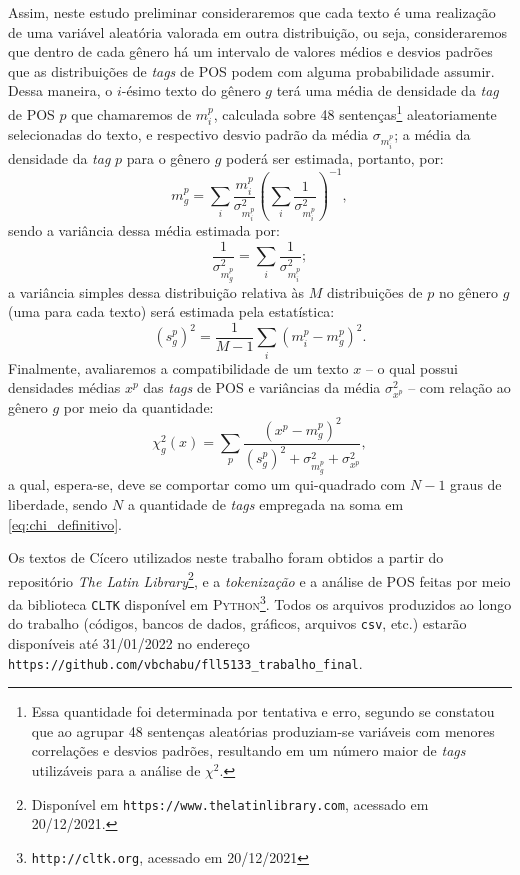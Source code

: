 \documentclass[10pt,a4paper,onecolumn]{article}
\theoremstyle{definition}
\theoremstyle{remark}
\begin{document}
Assim, neste estudo preliminar consideraremos que cada texto é uma realização de uma variável aleatória valorada em outra distribuição, ou seja, consideraremos que dentro de cada gênero há um intervalo de valores médios e desvios padrões que as distribuições de \emph{tags} de POS podem com alguma probabilidade assumir. Dessa maneira, o $i$-ésimo texto do gênero $g$ terá uma média de densidade da \emph{tag} de POS $p$ que chamaremos de $m_i^p$, calculada sobre 48 sentenças\footnote{Essa quantidade foi determinada por tentativa e erro, segundo se constatou que ao agrupar 48 sentenças aleatórias produziam-se variáveis com menores correlações e desvios padrões, resultando em um número maior de \emph{tags} utilizáveis para a análise de $\chi^2$.} aleatoriamente selecionadas do texto, e respectivo desvio padrão da média $\sigma_{m^p_i}$; a média da densidade da \emph{tag} $p$ para o gênero $g$ poderá ser estimada, portanto, por:   
$$m_g^p = \sum_i \frac{m_i^p}{\sigma^2_{m_i^p}} \left( \sum_{i} \frac{1}{\sigma^2_{m_i^p}} \right)^{-1},$$
sendo a variância dessa média estimada por:
$$\frac{1}{\sigma_{m_g^p}^2} = \sum_{i} \frac{1}{\sigma^2_{m_i^p}};$$
a variância simples dessa distribuição relativa às $M$ distribuições de $p$ no gênero $g$ (uma para cada texto) será estimada pela estatística:
$$\left(s^p_g\right)^2 = \frac{1}{M-1} \sum_i \left(m^p_i-m^p_g\right)^2.$$
Finalmente, avaliaremos a compatibilidade de um texto $x$ -- o qual possui densidades médias $x^p$ das \emph{tags} de POS e variâncias da média $\sigma_{x^p}^2$ -- com relação ao gênero $g$ por meio da quantidade: 
\begin{equation}\label{eq:chi_definitivo}
\chi^2_g(x) = \sum_p \frac{\left(x^p - m_g^p\right)^2}{\left(s^p_g\right)^2 + \sigma_{m_g^p}^2 + \sigma_{x^p}^2},
\end{equation}
a qual, espera-se, deve se comportar como um qui-quadrado com $N-1$ graus de liberdade, sendo $N$ a quantidade de \emph{tags} empregada na soma em \eqref{eq:chi_definitivo}.

\medskip

Os textos de Cícero utilizados neste trabalho foram obtidos a partir do repositório \emph{The Latin Library}\footnote{Disponível em \texttt{https://www.thelatinlibrary.com}, acessado em 20/12/2021.}, e a \emph{tokenização} e a análise de POS feitas por meio da biblioteca \texttt{CLTK} disponível em \textsc{Python}\footnote{\texttt{http://cltk.org}, acessado em 20/12/2021}. Todos os arquivos produzidos ao longo do trabalho (códigos, bancos de dados, gráficos, arquivos \texttt{csv}, etc.) estarão disponíveis até 31/01/2022 no endereço \texttt{https://github.com/vbchabu/fll5133\_trabalho\_final}.
\end{document}
